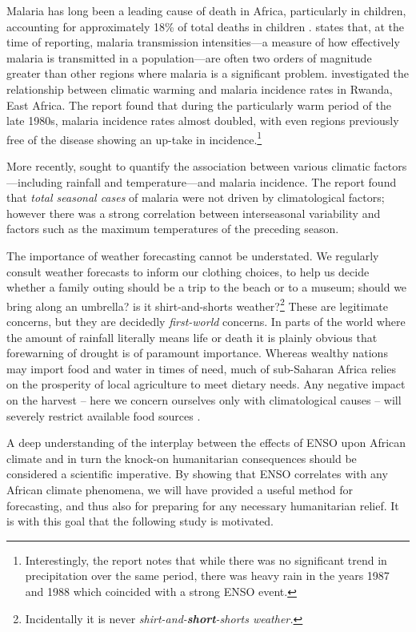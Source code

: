 Malaria has long been a leading cause of death in Africa, particularly in
children, accounting for approximately 18\% of total deaths in children
\citep{IMHE2016}. \citet{Alles1998} states that, at the time of reporting,
malaria transmission intensities---a measure of how effectively malaria is
transmitted in a population---are often two orders of magnitude greater than
other regions where malaria is a significant problem. \citet{loevinsohn1994}
investigated the relationship between climatic warming and malaria incidence
rates in Rwanda, East Africa. The report found that during the particularly warm
period of the late 1980s, malaria incidence rates almost doubled, with even
regions previously free of the disease showing an up-take in
incidence.\footnote{Interestingly, the report notes that while there was no
  significant trend in precipitation over the same period, there was heavy rain
  in the years 1987 and 1988 which coincided with a strong ENSO event.}

More recently, \cite{craig2004} sought to quantify the association between
various climatic factors---including rainfall and temperature---and malaria
incidence. The report found that \emph{total seasonal cases} of malaria were not
driven by climatological factors; however there was a strong correlation between
interseasonal variability and factors such as the maximum temperatures of the
preceding season.

\vspace{0.5cm}

The importance of weather forecasting cannot be understated. We regularly
consult weather forecasts to inform our clothing choices, to help us decide
whether a family outing should be a trip to the beach or to a museum; should we
bring along an umbrella? is it shirt-and-shorts weather?\footnote{Incidentally
  it is never \emph{shirt-and-\textbf{short}-shorts weather.}} These are
legitimate concerns, but they are decidedly \emph{first-world} concerns. In
parts of the world where the amount of rainfall literally means life or death it
is plainly obvious that forewarning of drought is of paramount importance.
Whereas wealthy nations may import food and water in times of need, much of
sub-Saharan Africa relies on the prosperity of local agriculture to meet dietary
needs. Any negative impact on the harvest -- here we concern ourselves only with
climatological causes -- will severely restrict available food sources
\citep{development2006mapping}.

A deep understanding of the interplay between the effects of ENSO upon African
climate and in turn the knock-on humanitarian consequences should be considered
a scientific imperative. By showing that ENSO correlates with any African
climate phenomena, we will have provided a useful method for forecasting, and
thus also for preparing for any necessary humanitarian relief. It is with this
goal that the following study is motivated.

